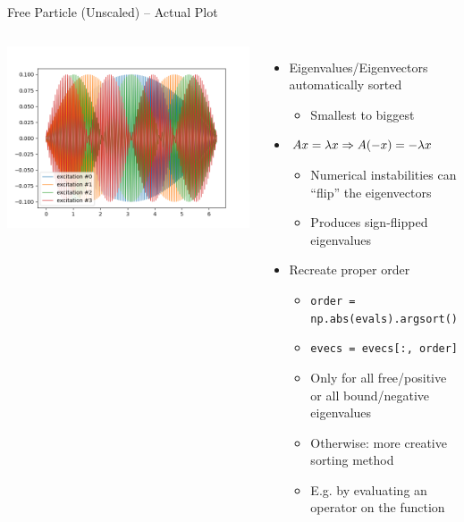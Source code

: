 \begin{frame}{Free Particle (Unscaled) -- Actual Plot}
%
\begin{columns}
\includegraphics[width=\linewidth]{./gfx/07-free-particle-fail}
%
\begin{itemize}
\item Eigenvalues/Eigenvectors automatically sorted
	\begin{itemize}
	\item Smallest to biggest
	\end{itemize}
\item $Ax = \lambda x \Rightarrow A(-x) = -\lambda x$
	\begin{itemize}
	\item Numerical instabilities can \enquote{flip} the eigenvectors
	\item Produces sign-flipped eigenvalues
	\end{itemize}
\item Recreate proper order
	\begin{itemize}
	\item \texttt{order = np.abs(evals).argsort()}
	\item \texttt{evecs = evecs[:, order]}
	\item Only for all free/positive or all bound/negative eigenvalues
	\item Otherwise: more creative sorting method
	\item E.\;g. by evaluating an operator on the function
	\end{itemize}
\end{itemize}
\end{columns}
%
\end{frame}

